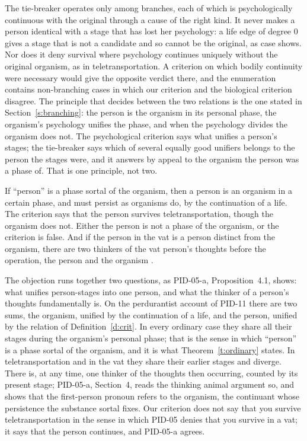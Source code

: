 \documentclass{situationist-preprint}
\begin{document}
\begin{reply}
The tie-breaker operates only among branches, each of which is psychologically continuous with the original through a cause of the right kind. It never makes a person identical with a stage that has lost her psychology: a life edge of degree $0$ gives a stage that is not a candidate and so cannot be the original, as case \caseDisrupted{} shows. Nor does it deny survival where psychology continues uniquely without the original organism, as in teletransportation. A criterion on which bodily continuity were necessary would give the opposite verdict there, and the enumeration contains \stbiodisN{} non-branching cases in which our criterion and the biological criterion disagree. The principle that decides between the two relations is the one stated in Section~\ref{s:branching}: the person is the organism in its personal phase, the organism's psychology unifies the phase, and when the psychology divides the organism does not. The psychological criterion says what unifies a person's stages; the tie-breaker says which of several equally good unifiers belongs to the person the stages were, and it answers by appeal to the organism the person was a phase of. That is one principle, not two.
\end{reply}

\begin{objection}\label{o:animal}
If \enquote{person} is a phase sortal of the organism, then a person is an organism in a certain phase, and must persist as organisms do, by the continuation of a life. The criterion says that the person survives teletransportation, though the organism does not. Either the person is not a phase of the organism, or the criterion is false. And if the person in the vat is a person distinct from the organism, there are two thinkers of the vat person's thoughts before the operation, the person and the organism \citep{Olson1997}.
\end{objection}

\begin{reply}
The objection runs together two questions, as PID-05-a, Proposition~4.1, shows: what unifies person-stages into one person, and what the thinker of a person's thoughts fundamentally is. On the perdurantist account of PID-11 there are two sums, the organism, unified by the continuation of a life, and the person, unified by the relation of Definition~\ref{d:crit}. In every ordinary case they share all their stages during the organism's personal phase; that is the sense in which \enquote{person} is a phase sortal of the organism, and it is what Theorem~\ref{t:ordinary} states. In teletransportation and in the vat they share their earlier stages and diverge. There is, at any time, one thinker of the thoughts then occurring, counted by its present stage; PID-05-a, Section~4, reads the thinking animal argument so, and shows that the first-person pronoun refers to the organism, the continuant whose persistence the substance sortal fixes. Our criterion does not say that you survive teletransportation in the sense in which PID-05 denies that you survive in a vat; it says that the person continues, and PID-05-a agrees.
\end{reply}
\end{document}
